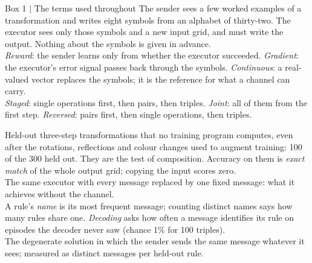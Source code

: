 \documentclass{nature}
\begin{document}
\begin{floatingbox}{{Box 1 $|$ The terms used throughout}}
 The sender sees a few worked examples of a transformation and writes eight symbols
from an alphabet of thirty-two. The executor sees only those symbols and a new input grid, and must write the
output. Nothing about the symbols is given in advance.\\[3pt]
 \emph{Reward}: the sender learns only from whether the executor succeeded. \emph{Gradient}:
the executor's error signal passes back through the symbols. \emph{Continuous}: a real-valued vector replaces the
symbols; it is the reference for what a channel can carry.\\[3pt]
 \emph{Staged}: single operations first, then pairs, then triples. \emph{Joint}: all of
them from the first step. \emph{Reversed}: pairs first, then single operations, then triples.\\[2pt]
\begin{center}\end{center}
 Held-out three-step transformations that no training program computes, even after the
rotations, reflections and colour changes used to augment training: 100 of the 300 held out. They are the test of
composition. Accuracy on them is \emph{exact match} of the whole output grid; copying the input scores zero.\\[3pt]
 The same executor with every message replaced by one fixed message: what it
achieves without the channel.\\[3pt]
 A rule's \emph{name} is its most frequent message; counting distinct names says how
many rules share one. \emph{Decoding} asks how often a message identifies its rule on episodes the decoder never
saw (chance 1\% for 100 triples).\\[3pt]
 The degenerate solution in which the sender sends the same message whatever it sees; measured
as distinct messages per held-out rule.
\end{floatingbox}
\end{document}
